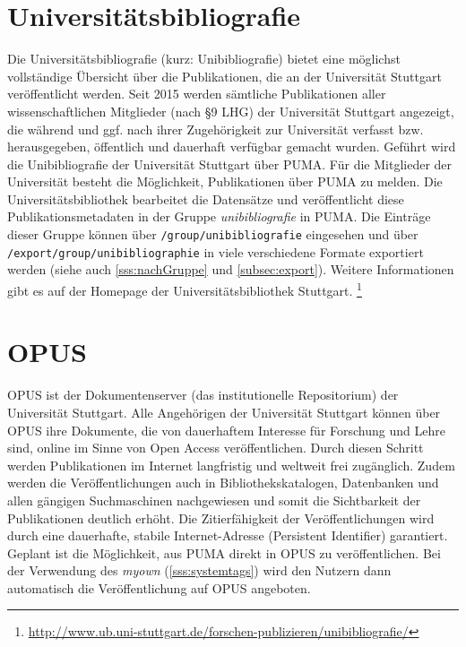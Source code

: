\section{Universitätsbibliografie}
\label{sec:unibibliografie}
Die Universitätsbibliografie (kurz: Unibibliografie) bietet eine möglichst vollständige Übersicht über die Publikationen, die an der Universität Stuttgart veröffentlicht werden. Seit 2015 werden sämtliche Publikationen aller wissenschaftlichen Mitglieder (nach §9 LHG) der Universität Stuttgart angezeigt, die während und ggf. nach ihrer Zugehörigkeit zur Universität verfasst bzw. herausgegeben, öffentlich und dauerhaft verfügbar gemacht wurden.\newline\newline
Geführt wird die Unibibliografie der Universität Stuttgart über PUMA. Für die Mitglieder der Universität besteht die Möglichkeit, Publikationen über PUMA zu melden. Die Universitätsbibliothek bearbeitet die Datensätze und veröffentlicht diese Publikationsmetadaten in der Gruppe \textit{unibibliografie} in PUMA. Die Einträge dieser Gruppe können über \texttt{/group/unibibliografie} eingesehen und über \texttt{/export/group/unibibliographie} in viele verschiedene Formate exportiert werden (siehe auch \autoref{sss:nachGruppe} und \autoref{subsec:export}). Weitere Informationen gibt es auf der Homepage der Universitätsbibliothek Stuttgart. \footnote{\url{http://www.ub.uni-stuttgart.de/forschen-publizieren/unibibliografie/}}
\section{OPUS}
\label{sec:opus}
OPUS ist der Dokumentenserver (das institutionelle Repositorium) der Universität Stuttgart. Alle Angehörigen der Universität Stuttgart können über OPUS ihre Dokumente, die von dauerhaftem Interesse für Forschung und Lehre sind, online im Sinne von Open Access veröffentlichen. Durch diesen Schritt werden Publikationen im Internet langfristig und weltweit frei zugänglich. Zudem werden die Veröffentlichungen auch in Bibliothekskatalogen, Datenbanken und allen gängigen Suchmaschinen nachgewiesen und somit die Sichtbarkeit der Publikationen deutlich erhöht. Die Zitierfähigkeit der Veröffentlichungen wird durch eine dauerhafte, stabile Internet-Adresse (Persistent Identifier) garantiert.
\newline\newline
Geplant ist die Möglichkeit, aus PUMA direkt in OPUS zu veröffentlichen. Bei der Verwendung des \tags \textit{myown} (\autoref{sss:systemtags}) wird den Nutzern dann automatisch die Veröffentlichung auf OPUS angeboten.  

